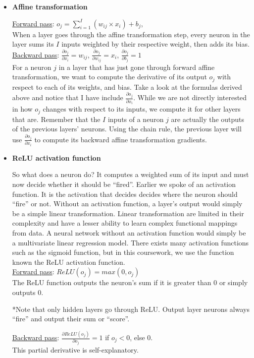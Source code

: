 \begin{itemize}
   \item \textbf{Affine transformation}
  
     \underline{Forward pass}: $o_j= \sum\limits_{i=1}^{I} (w_{ij} \times x_{i}) + b_j$, \\
     When a layer goes through the affine transformation step,
     every neuron in the layer sums its $I$ inputs weighted by their respective weight, then adds its bias.\\

     \underline{Backward pass}: $\frac{\partial o_j}{\partial x_i} = w_{ij}$,
     \space\space $\frac{\partial o_j}{\partial w_{ij}} = x_i$,
     \space\space$\frac{\partial o_j}{\partial b_j} = 1$\\ 
     For a neuron $j$ in a layer that has just gone through forward affine transformation,
     we want to compute the derivative of its output $o_j$ with respect to each of its weights, and bias.
     Take a look at the formulas derived above and notice that I have include $\frac{\partial o_j}{\partial x_i}$.
     While we are not directly interested in how $o_j$ changes with respect to its inputs, we compute it for other layers that are.
     Remember that the $I$ inputs of a neuron $j$ are actually the outputs of the previous layers' neurons.
     Using the chain rule, the previous layer will use $\frac{\partial o_j}{\partial x_i}$
     to compute its backward affine transformation gradients.

   \item \textbf{ReLU activation function}
   
     So what does a neuron do? It computes a weighted sum of its input and must now decide whether it should be ``fired''.
     Earlier we spoke of an activation function.
     It is the activation that decides decides where the neuron should ``fire'' or not.
     Without an activation function, a layer's output would simply be a simple linear transformation.
     Linear transformation are limited in their complexity and have a lesser ability to learn complex functional mappings from data.
     A neural network without an activation function would simply be a multivariate linear regression model.
     There exists many activation functions such as the sigmoid function,
     but in this coursework, we use the function known the ReLU activation function.\\
     
     \underline{Forward pass}: $ReLU(o_j) = max(0,o_j)$\\
     The ReLU function outputs the neuron's sum if it is greater than 0 or simply outputs 0.
     
     *Note that only hidden layers go through ReLU.
     Output layer neurons always ``fire'' and output their sum or ``score''.

     \underline{Backward pass}: $\frac{\partial ReLU(o_j)}{\partial o_j} = 1$ if $o_j < 0$, else 0.\\
     This partial derivative is self-explanatory.
     
\end{itemize}
